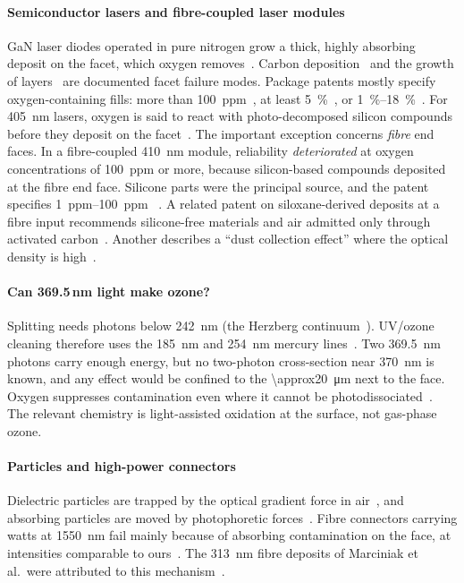 \paragraph{Semiconductor lasers and fibre-coupled laser modules} GaN laser diodes operated in pure
nitrogen grow a thick, highly absorbing deposit on the facet, which oxygen removes~\cite{Schoedl2005}.
Carbon deposition~\cite{Kim2008} and the growth of  layers~\cite{Freier2024,WangXW2021} are
documented facet failure modes. Package patents mostly specify oxygen-containing fills: more than
\SI{100}{ppm}~\cite{Corningpatent}, at least \SI{5}{\percent}~\cite{Sanyopatent}, or
\SIrange{1}{18}{\percent}~\cite{Sharppatent}. For \SI{405}{nm} lasers, oxygen is said to react with
photo-decomposed silicon compounds before they deposit on the facet~\cite{Panasonicpatent}. The important
exception concerns \emph{fibre} end faces. In a fibre-coupled \SI{410}{nm} module, reliability
\emph{deteriorated} at oxygen concentrations of \SI{100}{ppm} or more, because silicon-based compounds
deposited at the fibre end face. Silicone parts were the principal source, and the patent specifies
\SIrange{1}{100}{ppm} \Oxy~\cite{Fujifilmpatent2006}. A related patent on siloxane-derived 
deposits at a fibre input recommends silicone-free materials and air admitted only through activated
carbon~\cite{Ricohpatent}. Another describes a ``dust collection effect'' where the optical density is
high~\cite{Fujifilmpatent2007}.

\paragraph{Can 369.5\,nm light make ozone?} Splitting \Oxy{} needs photons below \SI{242}{nm} (the
Herzberg continuum~\cite{Yoshino1988}). UV/ozone cleaning therefore uses the \SI{185}{nm} and
\SI{254}{nm} mercury lines~\cite{Vig1985}. Two \SI{369.5}{nm} photons carry enough energy, but no
two-photon cross-section near \SI{370}{nm} is known, and any effect would be confined to the
\SI{\approx20}{\micro m} next to the face. Oxygen suppresses contamination even where it cannot be
photodissociated~\cite{Parthasarathy2024,Hippler2016}. The relevant chemistry is light-assisted oxidation
at the surface, not gas-phase ozone.

\paragraph{Particles and high-power connectors} Dielectric particles are trapped by the optical gradient
force in air~\cite{Ashkin1986,Omori1997}, and absorbing particles are moved by photophoretic
forces~\cite{Shvedov2009}. Fibre connectors carrying watts at \SI{1550}{nm} fail mainly because of
absorbing contamination on the face, at intensities comparable to ours~\cite{DeRosa2002,Seo2003,Domingues2011}.
The \SI{313}{nm} fibre deposits of Marciniak et al.\ were attributed to this mechanism~\cite{Marciniak2017}.

